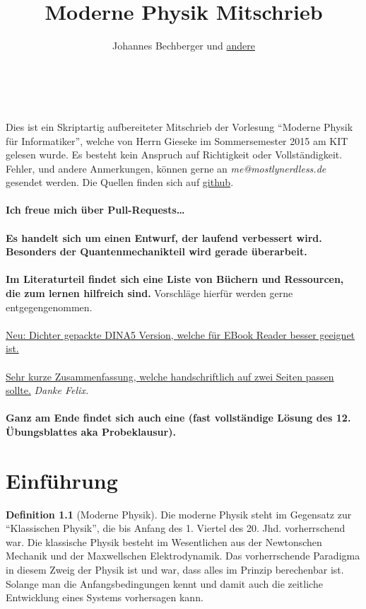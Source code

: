 \documentclass[oneside]{book}
\theoremstyle{definition}
\newtheorem*{definition*}{Definition}
\begin{document}
\title{Moderne Physik Mitschrieb}

\author{Johannes Bechberger und \href{https://github.com/parttimenerd/Moderne-Physik/graphs/contributors}{andere}}

\maketitle

\tableofcontents
~\\~\\
	Dies ist ein Skriptartig aufbereiteter Mitschrieb der Vorlesung "`Moderne Physik für Informatiker"', welche von Herrn Gieseke im Sommersemester 2015 am KIT gelesen wurde. Es besteht kein Anspruch auf Richtigkeit oder Vollständigkeit. Fehler, und andere Anmerkungen, können gerne an \textit{me@mostlynerdless.de} gesendet werden. Die Quellen finden sich auf \href{https://github.com/parttimenerd/Moderne-Physik}{github}.\\
	~\\
	\textbf{Ich freue mich über Pull-Requests\dots}\\
	~\\
	\textbf{Es handelt sich um einen Entwurf, der laufend verbessert wird. Besonders der Quantenmechanikteil wird gerade überarbeit.} ~\\
	
	~\\
	\textbf{Im Literaturteil findet sich eine Liste von Büchern und Ressourcen, die zum lernen hilfreich sind.} Vorschläge hierfür werden gerne entgegengenommen.
	~\\
	~\\
	\href{http://lgö.de/studium/moderne_physik/skript_dina5.pdf}{Neu: Dichter gepackte DINA5 Version, welche für EBook Reader besser geeignet ist.}
	~\\
	~\\
	\href{http://lgö.de/studium/moderne_physik/summary.pdf}{Sehr kurze Zusammenfassung, welche handschriftlich auf zwei Seiten passen sollte.} \textit{Danke Felix.}
	~\\
	~\\
	\textbf{Ganz am Ende findet sich auch eine (fast vollständige Lösung des 12. Übungsblattes aka Probeklausur).}
\listoftodos

\chapter{Einführung}

\begin{definition*}[Moderne Physik]
	Die moderne Physik steht im Gegensatz zur "`Klassischen Physik"', die bis Anfang des 1. Viertel des 20. Jhd. vorherrschend war. Die klassische Physik besteht im Wesentlichen aus der Newtonschen Mechanik und der Maxwellschen Elektrodynamik.
	Das vorherrschende Paradigma in diesem Zweig der Physik ist und war, dass alles im Prinzip berechenbar ist. Solange man die Anfangsbedingungen kennt und damit auch die zeitliche Entwicklung eines Systems vorhersagen kann.
\end{definition*}
\end{document}
